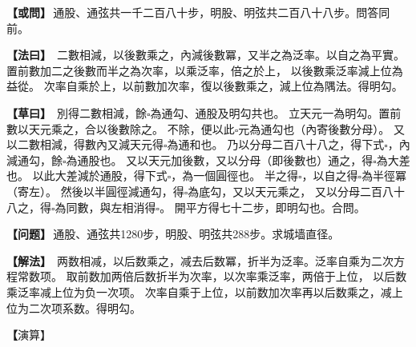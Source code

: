 \documentclass[11pt,a4paper]{article}
\let\origsquare\square
\renewcommand{\square}{\ensuremath{\origsquare}}%
\newcommand{\clOWEN}[1]{%
  \par\vspace{0.3em}%
  \noindent\textcolor{problemcolor}{\textbf{【或問】}}\,{\tradfont #1}\par\nopagebreak%
}
\newcommand{\mdOWEN}[1]{%
  \par\vspace{0.3em}%
  \noindent\textcolor{problemcolor}{\textbf{【问题】}}\,{\modfont #1}\par\nopagebreak%
}
\newcommand{\clFAYUE}[1]{%
  \par\noindent\textcolor{methodcolor}{\textbf{【法曰】}}\,{\tradfont #1}\par\nopagebreak%
}
\newcommand{\mdFAYUE}[1]{%
  \par\noindent\textcolor{methodcolor}{\textbf{【解法】}}\,{\modfont #1}\par\nopagebreak%
}
\newcommand{\clTSAOYUE}[1]{%
  \par\noindent\textcolor{workcolor}{\textbf{【草曰】}}\,{\tradfont #1}\par%
}
\newcommand{\mdTSAOYUE}[1]{%
  \par\noindent\textcolor{workcolor}{\textbf【演算】}}\,{\modfont #1}\par%
\begin{document}
\begin{paracol}{2}

\begin{leftcolumn}
\clOWEN{通股、通弦共一千二百八十步，明股、明弦共二百八十八步。問答同前。}

\clFAYUE{%
二數相減，以後數乘之，內減後數冪，又半之為泛率。以自之為平實。
置前數加二之後數而半之為次率，以乘泛率，倍之於上，
以後數乘泛率減上位為益從。
次率自乘於上，以前數加次率，復以後數乘之，減上位為隅法。得明勾。}

\clTSAOYUE{%
別得二數相減，餘$\square$為通勾、通股及明勾共也。
立天元一為明勾。置前數以天元乘之，合以後數除之。
不除，便以此$\square$元為通勾也（內寄後數分母）。
又以二數相減，得數內又減天元得$\square$為通和也。
乃以分母二百八十八之，得下式$\square$，內減通勾，餘$\square$為通股也。
又以天元加後數，又以分母（即後數也）通之，得$\square$為大差也。
以此大差減於通股，得下式$\square$，為一個圓徑也。
半之得$\square$，以自之得$\square$為半徑冪（寄左）。
然後以半圓徑減通勾，得$\square$為底勾，又以天元乘之，
又以分母二百八十八之，得$\square$為同數，與左相消得$\square$。
開平方得七十二步，即明勾也。合問。}
\end{leftcolumn}

\switchcolumn

\begin{rightcolumn}
\mdOWEN{通股、通弦共1280步，明股、明弦共288步。求城墙直径。}

\mdFAYUE{%
两数相减，以后数乘之，减去后数冪，折半为泛率。泛率自乘为二次方程常数项。
取前数加两倍后数折半为次率，以次率乘泛率，两倍于上位，
以后数乘泛率减上位为负一次项。
次率自乘于上位，以前数加次率再以后数乘之，减上位为二次项系数。得明勾。}

\mdTSAOYUE{%
辨识得：两数相减余$\square$为通勾、通股及明勾之和。
设天元一为明勾。取前数以天元乘之，应以后数除之。
不除，便以此$\square$元为通勾（内寄后数为分母）。
又以两数相减，得数内再减天元得$\square$为通和。
以分母288通之，得下式$\square$，内减通勾余$\square$为通股。
又以天元加后数，再以分母（即后数）通之，得$\square$为大差。
以此大差减于通股，得下式$\square$为一个圆径。
折半得$\square$，自乘得$\square$为半半径冪（寄左）。
然后以半圆径减通勾得$\square$为底勾，再以天元乘之，
又以分母288通之，得$\square$为同数，与左式相消得$\square$。
开平方得72步，即明勾。符合所问。}
\end{rightcolumn}

\end{paracol}
\end{document}
